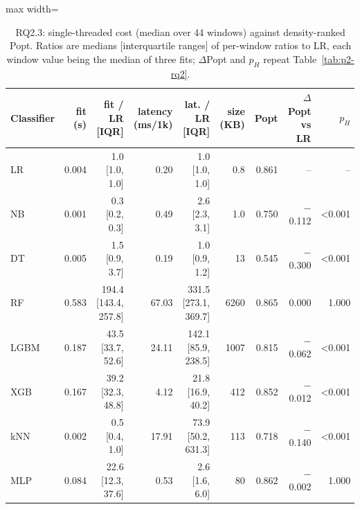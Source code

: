 \begin{table}[t]
\centering
\footnotesize
\caption{RQ2.3: single-threaded cost (median over 44 windows) against density-ranked Popt. Ratios are medians [interquartile ranges] of per-window ratios to LR, each window value being the median of three fits; $\Delta$Popt and $p_H$ repeat Table~\ref{tab:p2-rq2}.}
\label{tab:p2-cost}
\begin{adjustbox}{max width=\linewidth}
\begin{tabular}{lrrrrrrrr}
\toprule
Classifier & fit (s) & fit / LR [IQR] & latency (ms/1k) & lat. / LR [IQR] & size (KB) & Popt & $\Delta$Popt vs LR & $p_H$ \\
\midrule
LR & 0.004 & 1.0 [1.0, 1.0] & 0.20 & 1.0 [1.0, 1.0] & 0.8 & 0.861 & -- & -- \\
NB & 0.001 & 0.3 [0.2, 0.3] & 0.49 & 2.6 [2.3, 3.1] & 1.0 & 0.750 & $-$0.112 & <0.001 \\
DT & 0.005 & 1.5 [0.9, 3.7] & 0.19 & 1.0 [0.9, 1.2] & 13 & 0.545 & $-$0.300 & <0.001 \\
RF & 0.583 & 194.4 [143.4, 257.8] & 67.03 & 331.5 [273.1, 369.7] & 6260 & 0.865 & 0.000 & 1.000 \\
LGBM & 0.187 & 43.5 [33.7, 52.6] & 24.11 & 142.1 [85.9, 238.5] & 1007 & 0.815 & $-$0.062 & <0.001 \\
XGB & 0.167 & 39.2 [32.3, 48.8] & 4.12 & 21.8 [16.9, 40.2] & 412 & 0.852 & $-$0.012 & <0.001 \\
kNN & 0.002 & 0.5 [0.4, 1.0] & 17.91 & 73.9 [50.2, 631.3] & 113 & 0.718 & $-$0.140 & <0.001 \\
MLP & 0.084 & 22.6 [12.3, 37.6] & 0.53 & 2.6 [1.6, 6.0] & 80 & 0.862 & $-$0.002 & 1.000 \\
\bottomrule
\end{tabular}
\end{adjustbox}
\end{table}

